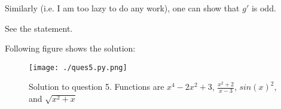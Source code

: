 \documentclass[answers,addpoints]{exam}
\begin{document}
\begin{questions}
\begin{parts}
\begin{solution}
            Similarly (i.e. I am too lazy to do any work), one can show that
            $g'$ is odd.
            
        \end{solution}
    \end{parts}


    \question[20]
    See the statement.

    \begin{solution}

        Following figure shows the solution:
    \end{solution}

    \begin{figure}[ht!]
        \begin{center}
            \texttt{[image: ./ques5.py.png]}
        \end{center}

        \caption{Solution to question 5. Functions are $x^4-2x^2+3$,
        $\frac{x^2+2}{x-3}$, $sin(x)^2$, and $\sqrt{x^2 + x}$ }

    \end{figure}

\end{questions}
\end{document}
